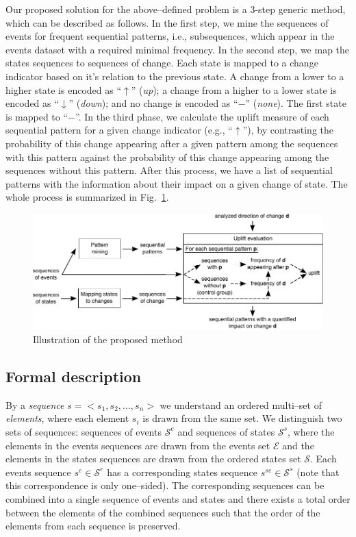 \documentclass[runningheads,a4paper]{llncs}
\begin{document}
Our proposed solution for the above--defined problem is a 3-step generic method, which can be described as follows.
In the first step, we mine the sequences of events for frequent sequential patterns, i.e., subsequences, which appear in the events dataset with a required minimal frequency.
In the second step, we map the states sequences to sequences of change.
Each state is mapped to a change indicator based on it's relation to the previous state.
A change from a lower to a higher state is encoded as ``$\uparrow$'' (\textit{up}); a change from a higher to a lower state is encoded as ``$\downarrow$'' (\textit{down}); and no change is encoded as ``$-$'' (\textit{none}).
The first state is mapped to ``$-$''.
In the third phase, we calculate the uplift measure of each sequential pattern for a given change indicator (e.g., ``$\uparrow$''), by contrasting the probability of this change appearing after a given pattern among the sequences with this pattern against the probability of this change appearing among the sequences without this pattern.
After this process, we have a list of sequential patterns with the information about their impact on a given change of state.
The whole process is summarized in Fig.~\ref{fig:concept}.

\begin{figure}[!ht]
	\centering
		\includegraphics[width=\textwidth]{images/concept}
	\caption{Illustration of the proposed method}
	\label{fig:concept}
\end{figure}

\subsection{Formal description}
By a \textit{sequence} $s=<s_1, s_2, ..., s_n>$ we understand an ordered multi--set of \textit{elements}, where each element $s_i$ is drawn from the same set.
We distinguish two sets of sequences: sequences of events $\mathcal{S}^e$ and sequences of states $\mathcal{S}^s$, where the elements in the events sequences are drawn from the events set $\mathcal{E}$ and the elements in the states sequences are drawn from the ordered states set $\mathcal{S}$.
Each events sequence $s^e\in\mathcal{S}^e$ has a corresponding states sequence $s^{se}\in\mathcal{S}^s$ (note that this correspondence is only one--sided).
The corresponding sequences can be combined into a single sequence of events and states and there exists a total order between the elements of the combined sequences such that the order of the elements from each sequence is preserved.
\end{document}
